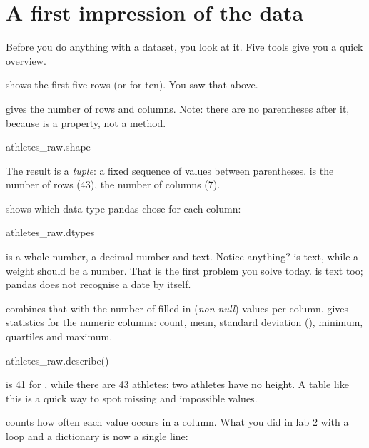 \documentclass[11pt,a4paper]{article}
\begin{document}
\section{A first impression of the data}

Before you do anything with a dataset, you look at it. Five tools give
you a quick overview.

\textbf{} shows the first five rows (or 
for ten). You saw that above.

\textbf{} gives the number of rows and columns. Note:
there are no parentheses after it, because  is a property,
not a method.

\begin{python}
athletes_raw.shape
\end{python}

The result is a \emph{tuple}: a fixed sequence of values between
parentheses.  is the number of rows (43),
 the number of columns (7).

\textbf{} shows which data type pandas chose for each
column:

\begin{python}
athletes_raw.dtypes
\end{python}

 is a whole number,  a decimal number and
 text. Notice anything?  is text, while a
weight should be a number. That is the first problem you solve today.
 is text too; pandas does not recognise a date by
itself.

\textbf{} combines that with the number of filled-in
(\emph{non-null}) values per column. \textbf{} gives
statistics for the numeric columns: count, mean, standard deviation
(), minimum, quartiles and maximum.

\begin{python}
athletes_raw.describe()
\end{python}

 is 41 for , while there are 43 athletes:
two athletes have no height. A table like this is a quick way to spot
missing and impossible values.

\textbf{} counts how often each value occurs in
a column. What you did in lab 2 with a loop and a dictionary is now a
single line:
\end{document}
